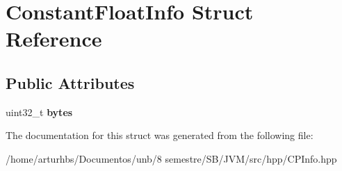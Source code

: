\hypertarget{structConstantFloatInfo}{}\section{Constant\+Float\+Info Struct Reference}
\label{structConstantFloatInfo}
\subsection*{Public Attributes}
\begin{DoxyCompactItemize}
\item 
uint32\+\_\+t {\bfseries bytes}\hypertarget{structConstantFloatInfo_a73fe6845d0616920001d18e68c8a228b}{}\label{structConstantFloatInfo_a73fe6845d0616920001d18e68c8a228b}

\end{DoxyCompactItemize}


The documentation for this struct was generated from the following file\+:\begin{DoxyCompactItemize}
\item 
/home/arturhbs/\+Documentos/unb/8 semestre/\+S\+B/\+J\+V\+M/src/hpp/C\+P\+Info.\+hpp\end{DoxyCompactItemize}
